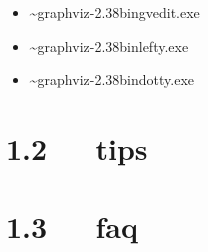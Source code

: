 \documentclass[letterpaper,12pt,english]{sphinxmanual}
\begin{document}
\begin{itemize}
\item {} 
\textasciitilde{}graphviz-2.38bingvedit.exe

\item {} 
\textasciitilde{}graphviz-2.38binlefty.exe

\item {} 
\textasciitilde{}graphviz-2.38bindotty.exe

\end{itemize}


\section{1.2   tips}
\label{\detokenize{001software/001install/Graphviz:tips}}

\section{1.3   faq}
\label{\detokenize{001software/001install/Graphviz:faq}}
\end{document}

